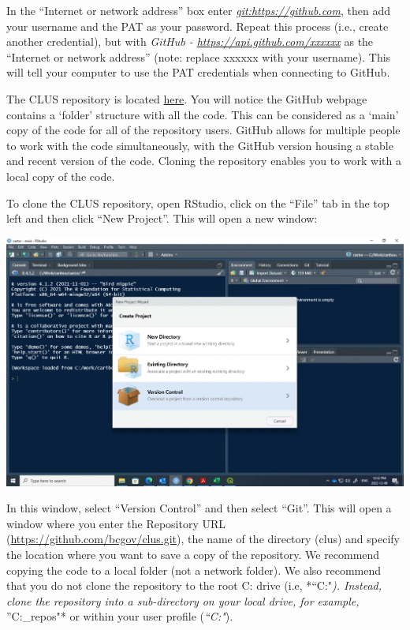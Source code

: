 \documentclass[
]{article}
\begin{document}
In the ``Internet or network address'' box enter
\emph{\url{git:https://github.com}}, then add your username and the PAT
as your password. Repeat this process (i.e., create another credential),
but with \emph{GitHub - \url{https://api.github.com/xxxxxx}} as the
``Internet or network address'' (note: replace xxxxxx with your
username). This will tell your computer to use the PAT credentials when
connecting to GitHub.

The CLUS repository is located
\href{https://github.com/bcgov/clus.git}{here}. You will notice the
GitHub webpage contains a `folder' structure with all the code. This can
be considered as a `main' copy of the code for all of the repository
users. GitHub allows for multiple people to work with the code
simultaneously, with the GitHub version housing a stable and recent
version of the code. Cloning the repository enables you to work with a
local copy of the code.

To clone the CLUS repository, open RStudio, click on the ``File'' tab in
the top left and then click ``New Project''. This will open a new
window:

\includegraphics{images/git.jpg}

In this window, select ``Version Control'' and then select ``Git''. This
will open a window where you enter the Repository URL
(\url{https://github.com/bcgov/clus.git}), the name of the directory
(clus) and specify the location where you want to save a copy of the
repository. We recommend copying the code to a local folder (not a
network folder). We also recommend that you do not clone the repository
to the root C: drive (i.e, *``C:"\emph{). Instead, clone the repository
into a sub-directory on your local drive, for example,
}''C:\work\git\_repos"* or within your user profile
(\emph{``C:\username"}).
\end{document}
